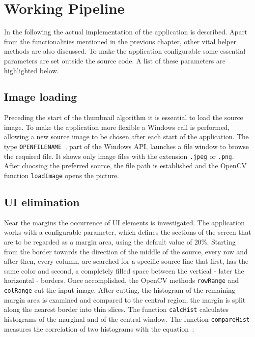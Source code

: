 \documentclass[draft,final]{vutinfth} %
\begin{document}
	\section{Working Pipeline}
	In the following the actual implementation of the application is described.
	Apart from the functionalities mentioned in the previous chapter, other vital helper methods are also discussed.
	To make the application configurable some essential parameters are set outside the source code. 
	A list of these parameters are highlighted below.
	
	\subsection{Image loading}
	Preceding the start of the thumbnail algorithm it is essential to load the source image.
	To make the application more flexible a Windows call is performed, allowing a new source image to be chosen after each start of the application.
	The type \texttt{OPENFILENAME}~\cite{openfilename}, part of the Windows API, launches a file window to browse the required file.
	It shows only image files with the extension \texttt{.jpeg} or \texttt{.png}.
	After choosing the preferred source, the file path is established and the OpenCV function \texttt{loadImage} opens the picture.
	
	\subsection{UI elimination}
	Near the margins the occurrence of UI elements is investigated.
	The application works with a configurable parameter, which defines the sections of the screen that are to be regarded as a margin area, using the default value of 20\%. 
	Starting from the border towards the direction of the middle of the source, every row and after then, every column, are searched for a specific source line that first, has the same color and second, a completely filled space between the vertical - later the horizontal - borders.
	Once accomplished, the OpenCV methods \texttt{rowRange} and \texttt{colRange} cut the input image.
	After cutting, the histogram of the remaining margin area is examined and compared to the central region, the margin is split along the nearest border into thin slices.
	The function \texttt{calcHist} calculates histograms of the marginal and of the central window.
	The function \texttt{compareHist} measures the correlation of two histograms with the equation~\cite{compareHist}:
\end{document}
